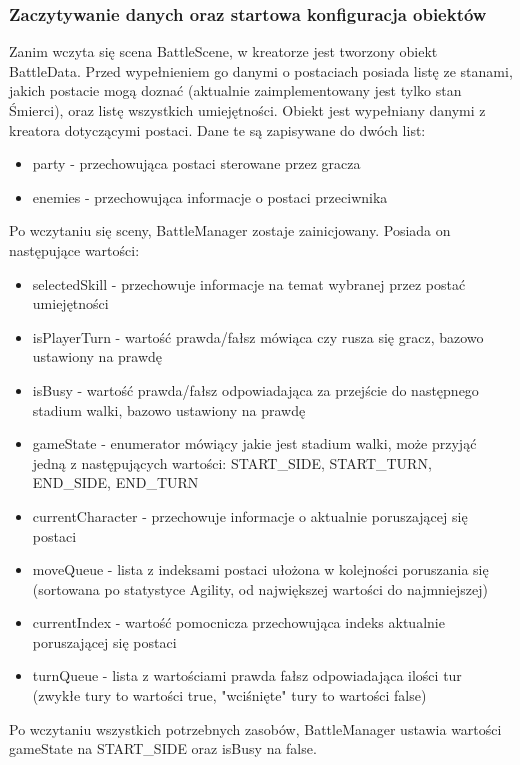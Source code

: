 \documentclass{SGGW-thesis}
\begin{document}
\subsubsection{Zaczytywanie danych oraz startowa konfiguracja obiektów}
Zanim wczyta się scena BattleScene, w kreatorze jest tworzony obiekt BattleData. Przed wypełnieniem go danymi o postaciach posiada listę ze stanami, 
jakich postacie mogą doznać (aktualnie zaimplementowany jest tylko stan Śmierci), oraz listę wszystkich umiejętności. Obiekt jest wypełniany danymi z
kreatora dotyczącymi postaci. Dane te są zapisywane do dwóch list:
\begin{itemize}
  \item{party - przechowująca postaci sterowane przez gracza}
  \item{enemies - przechowująca informacje o postaci przeciwnika}
\end{itemize}
Po wczytaniu się sceny, BattleManager zostaje zainicjowany. Posiada on następujące wartości:
\begin{itemize}
  \item{selectedSkill - przechowuje informacje na temat wybranej przez postać umiejętności}
  \item{isPlayerTurn - wartość prawda/fałsz mówiąca czy rusza się gracz, bazowo ustawiony na prawdę}
  \item{isBusy - wartość prawda/fałsz odpowiadająca za przejście do następnego stadium walki, bazowo ustawiony na prawdę}
  \item{gameState - enumerator mówiący jakie jest stadium walki, może przyjąć jedną z następujących wartości: START\_SIDE, START\_TURN, END\_SIDE, END\_TURN}
  \item{currentCharacter - przechowuje informacje o aktualnie poruszającej się postaci}
  \item{moveQueue - lista z indeksami postaci ułożona w kolejności poruszania się (sortowana po statystyce Agility, od największej wartości do najmniejszej)}
  \item{currentIndex - wartość pomocnicza przechowująca indeks aktualnie poruszającej się postaci}
  \item{turnQueue - lista z wartościami prawda fałsz odpowiadająca ilości tur (zwykłe tury to wartości true, "wciśnięte" tury to wartości false)}
\end{itemize}
Po wczytaniu wszystkich potrzebnych zasobów, BattleManager ustawia wartości gameState na START\_SIDE oraz isBusy na false.
\end{document}
